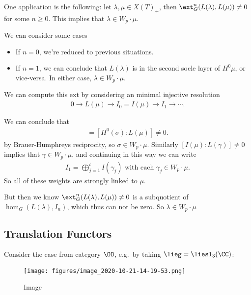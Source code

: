 \begin{remark}

One application is the following: let \(\lambda, \mu \in X(T)_+\), then
\(\ext_G^n(L(\lambda), L(\mu)) \neq 0\) for some \(n \geq 0\). This
implies that \(\lambda \in W_p \cdot \mu\).

We can consider some cases

\begin{itemize}
\tightlist
\item
  If \(n=0\), we're reduced to previous situations.
\item
  If \(n=1\), we can conclude that \(L(\lambda)\) is in the second socle
  layer of \(H^0 \mu\), or vice-versa. In either case,
  \(\lambda \in W_p \cdot \mu\).
\end{itemize}

We can compute this ext by considering an minimal injective resolution
\begin{align*}  
0 \to L(\mu) \to I_0 = I(\mu) \to I_1 \to \cdots
.\end{align*}

We can conclude that
\begin{align*}
[I(\mu) : H^0(\sigma)] = [H^0(\sigma): L(\mu)] \neq 0
.\end{align*} by Brauer-Humphreys reciprocity, so
\(\sigma \in W_p \cdot \mu\). Similarly \([I(\mu): L(\gamma)] \neq 0\)
implies that \(\gamma \in W_p \cdot \mu\), and continuing in this way we
can write
\begin{align*}
I_1 = \bigoplus_{j=1}^t I(\gamma_j) 
\text{ with each } 
\gamma_j \in W_p \cdot \mu
.\end{align*} So all of these weights are strongly linked to \(\mu\).

But then we know \(\ext_G^n (L(\lambda), L(\mu)) \neq 0\) is a
subquotient of \(\hom_G(L(\lambda), I_n)\), which thus can not be zero.
So \(\lambda \in W_p \cdot \mu\)

\end{remark}

\hypertarget{translation-functors}{%
\subsection{Translation Functors}\label{translation-functors}}

Consider the case from category \(\OO\), e.g.~by taking
\(\lieg = \liesl_3(\CC)\):

\begin{figure}
\centering
\texttt{[image: figures/image\_2020-10-21-14-19-53.png]}
\caption{Image}
\end{figure}

